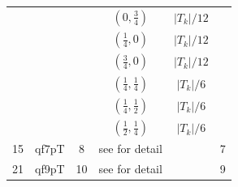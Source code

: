 \documentclass[a4paper,twoside,12pt]{book}
\begin{document}
\begin{center}
\begin{tabular}{|c|c|c|c|c|c|}
      &         & &$\left(0,\frac{3}{4}\right)$ & $|T_k|/12$ &   \\
      &         & &$\left(\frac{1}{4},0\right)$ & $|T_k|/12$ &   \\
      &         & &$\left(\frac{3}{4},0\right)$ & $|T_k|/12$ &   \\
      &         & &$\left(\frac{1}{4},\frac{1}{4}\right)$ & $|T_k|/6$ &   \\
      &         & &$\left(\frac{1}{4},\frac{1}{2}\right)$ & $|T_k|/6$ &   \\
      &         & &$\left(\frac{1}{2},\frac{1}{4}\right)$ & $|T_k|/6$ &   \\
    \hline
    15 & qf7pT& 8 & see  \cite{0501496} for detail  & &7 \\
       \hline
    21 & qf9pT& 10 & see \cite{0501496} for detail  & &9 \\
    \hline

\end{tabular}
 

 
\end{center}

\bigskip
\end{document}
